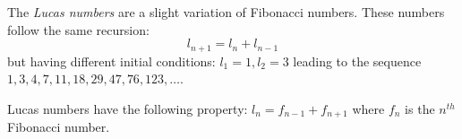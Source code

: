 \documentclass[12pt]{article}
\begin{document}
The \emph{Lucas numbers} are a slight variation of Fibonacci numbers. 
These numbers follow the same recursion:
$$l_{n+1}=l_n + l_{n-1}$$
but having different initial conditions: $l_1=1, l_2=3$ leading to the sequence
$1, 3, 4, 7, 11, 18, 29, 47, 76, 123,\ldots$.

Lucas numbers have the following property: $l_n=f_{n-1}+f_{n+1}$ where $f_n$ is the $n^{th}$ Fibonacci number.
\end{document}
